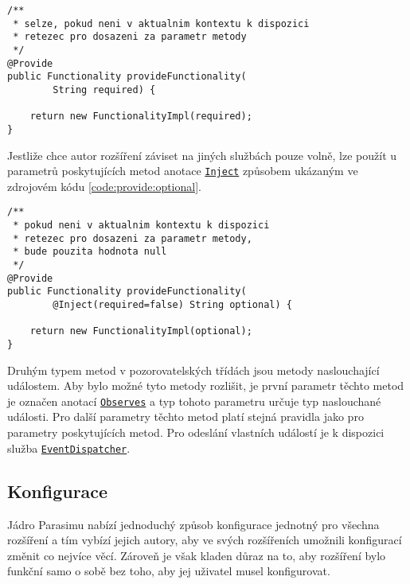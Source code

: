 \begin{lstlisting}[label={code:provide:required}, caption={První metoda poskytující službu \texttt{Functionality}}, style=Java]
/**
 * selze, pokud neni v aktualnim kontextu k dispozici 
 * retezec pro dosazeni za parametr metody
 */
@Provide
public Functionality provideFunctionality(
		String required) {

	return new FunctionalityImpl(required);
}
\end{lstlisting}

Jestliže chce autor rozšíření záviset na jiných službách pouze volně, lze použít 
u parametrů poskytujících metod anotace \href{https://github.com/sybila/parasim/blob/2.0.0.Final/core/src/main/java/org/sybila/parasim/core/annotation/Inject.java}{\texttt{Inject}} způsobem u\-ká\-za\-ným ve zdrojovém
kódu \ref{code:provide:optional}.

\begin{lstlisting}[label={code:provide:optional}, caption={Druhá metoda poskytující službu \texttt{Functionality}}, style=Java]
/**
 * pokud neni v aktualnim kontextu k dispozici 
 * retezec pro dosazeni za parametr metody,
 * bude pouzita hodnota null
 */
@Provide
public Functionality provideFunctionality(
		@Inject(required=false) String optional) {

	return new FunctionalityImpl(optional);
}
\end{lstlisting}

Druhým typem metod v pozorovatelských třídách jsou metody na\-slou\-cha\-jí\-cí událostem.
Aby bylo možné tyto metody rozlišit, je první parametr těchto metod je označen anotací \href{https://github.com/sybila/parasim/blob/2.0.0.Final/core/src/main/java/org/sybila/parasim/core/annotation/Observes.java}{\texttt{Observes}}
a typ tohoto parametru určuje typ naslouchané události. Pro další parametry těchto metod platí
stejná pravidla jako pro parametry poskytujících metod. Pro odeslání vlastních událostí
je k dispozici služba \href{https://github.com/sybila/parasim/blob/2.0.0.Final/core/src/main/java/org/sybila/parasim/core/api/EventDispatcher.java}{\texttt{EventDispatcher}}.

\subsection{Konfigurace}

Jádro Parasimu nabízí jednoduchý způsob konfigurace jednotný pro všech\-na rozšíření
a tím vybízí jejich autory, aby ve svých rozšířeních umožnili konfigurací změnit
co nejvíce věcí. Zároveň je však kladen důraz na to, aby rozšíření bylo funkční 
samo o sobě bez toho, aby jej uživatel musel konfigurovat.

